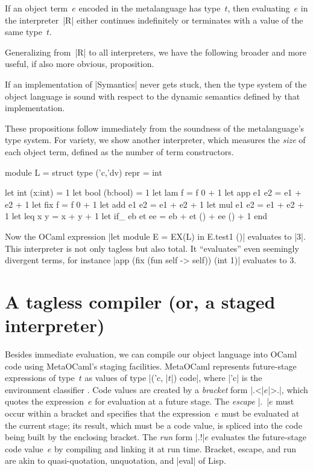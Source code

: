 \fi
\begin{proposition}
If an object term~$e$ encoded in the metalanguage has type~$t$,
then evaluating~$e$ in the interpreter~|R| either continues
indefinitely or terminates with a value of the same type~$t$.
\end{proposition}
\ifshort\else
Generalizing from~|R| to all interpreters, we have the following
broader and more useful, if also more obvious, proposition.
\fi
\begin{proposition}
  If an implementation of |Symantics| never gets stuck, then
  the type system of the object
  language is sound with respect to the dynamic semantics defined by
  that implementation.
\end{proposition}
\ifshort\else
These propositions follow immediately from the soundness of the
metalanguage's type system.
\fi
\ifshort\else
For variety, we show another interpreter, which measures the \emph{size}
of each object term, defined as the number of term
constructors.
\begin{code}
module L = struct
  type ('c,'dv) repr = int

  let int  (x:int)  = 1
  let bool (b:bool) = 1
  let lam  f        = f 0 + 1
  let app  e1 e2    = e1 + e2 + 1
  let fix  f        = f 0 + 1
  let add  e1 e2    = e1 + e2 + 1
  let mul  e1 e2    = e1 + e2 + 1
  let leq  x y      = x + y + 1
  let if_  eb et ee = eb + et () + ee () + 1
end
\end{code}
Now the OCaml expression
|let module E = EX(L) in E.test1 ()|
evaluates to |3|. This interpreter is not only tagless but also
total. It ``evaluates'' even seemingly divergent terms, for instance
|app (fix (fun self -> self)) (int 1)| evaluates to $3$.
\fi

\begin{comment}
\begin{code}
module EX1(S: Symantics) = struct
 open S
 let tfix () = app (fix (fun self -> self)) (int 1)
end;;
let module E =EX1(R) in E.tfix ();;
let module E =EX1(L) in E.tfix ();;
\end{code}
\end{comment}

\section{A tagless compiler (or, a staged interpreter)}\label{S:compiler}

Besides immediate evaluation, we can compile our object language
into OCaml code using MetaOCaml's staging facilities. MetaOCaml
represents future-stage expressions of type~$t$
as values of type |('c, |$t$|) code|, where |'c| is the
environment classifier \citep{WalidPOPL03,calcagno-ml-like}. Code values are created
by a \emph{bracket} form |.<|$e$|>.|, which quotes the expression~$e$ for
evaluation at a future stage. The \emph{escape} |.~|$e$ must occur
within a bracket and specifies that the expression~$e$ must be evaluated
at the current stage; its result, which must be a code value, is
spliced into the code being built by the enclosing bracket. The \emph{run} form |.!|$e$ evaluates
the future-stage code value~$e$ by compiling and linking it at run time.
Bracket, escape, and run are akin to
quasi-quotation, unquotation, and |eval| of Lisp.

